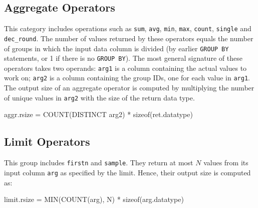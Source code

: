 \documentclass[conference]{IEEEtran}
\def\Skip{\par\medskip\nobreak\noindent}
\begin{document}
\subsection{Aggregate Operators}
This category includes operations such as \texttt{\small sum}, \texttt{\small avg}, \texttt{\small min}, \texttt{\small max}, \texttt{\small count}, \texttt{\small single} and \texttt{\small dec\_round}.
The number of values returned by these operators equals the number of groups in which the input data column is divided (by earlier \texttt{\small GROUP BY} statements, or 1 if there is no \texttt{\small GROUP BY}).
The most general signature of these operators takes two operands: \texttt{\small arg1} is a column containing the actual values to work on; \texttt{\small arg2} is a column containing the group IDs, one for each value in \texttt{\small arg1}.
The output size of an aggregate operator is computed by multiplying the number of unique values in \texttt{\small arg2} with the size of the return data type.
\begin{verb}
aggr.rsize = COUNT(DISTINCT arg2) * sizeof(ret.datatype)
\end{verb}

\subsection{Limit Operators}
This group includes \texttt{\small firstn} and \texttt{\small sample}.
They return at most $N$ values from its input column \texttt{\small arg} as specified by the limit.
Hence, their output size is computed as:
\begin{verb}
limit.rsize = MIN(COUNT(arg), N) * sizeof(arg.datatype)
\end{verb}
\end{document}
